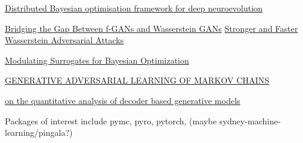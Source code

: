 \documentclass[honours,12pt]{unswthesis}
\numberwithin{equation}{section}
\begin{document}
\href{https://pdf.sciencedirectassets.com/271597/1-s2.0-S0925231221X00409/1-s2.0-S0925231221015319/main.pdf?X-Amz-Security-Token=IQoJb3JpZ2luX2VjEAsaCXVzLWVhc3QtMSJGMEQCIFyD6EVhq7gdc13HAw8Qa2abqSEg7RfyW64DmMVAwR%2FAAiAx%2FqYNhfvEXwgQS08r%2FMhhr5VEr%2Be%2BKQ7Nbt9dBYn1iir6AwgjEAQaDDA1OTAwMzU0Njg2NSIMzSUp5Xe14ZtAoyoUKtcD5V8UPCBeS1sryr6y2PzuwXdsx%2FBvmdgsnfgRx1Acrgomb7ZC%2BVpRecYAvucvzsgbXwr4%2FY23IWXOjQVvqaIcF9d6%2F3VF5lJjfBtqyUDoUAZ6fMfSVsgKbMRkbIK%2BUaZot4%2BXfz7LLN3HZla8oHd2sTktGlGF8x4e9UR2PONy%2FZt%2B8Le6H%2FpmTQOEChAS5I23%2Bw0g%2BbW%2B%2FMIOpbdP4tGzrxVpJX4swn1N5QW4SIVF1abKsksuJPt%2FAGLYy%2BzlTEGZ55ycsE0DO3HIQHzRcQcO0MCYd0GcP8sNOmRCk3Jay5KLK%2FPdw0xHow7982Mra1vNMPHgcNPESFshdfg3ukTsqBWWi6AsbEiYJwJDbO1CHpZ4WGllcAvKc91KyLqQE6XUSLzJUCykxTtb1rvjq9ypjki44bdW2ROmKJ%2BymoRnGspYm8U%2FweObZTTKA5LygERVcMPMXLutBWzdSJxvE2DoRgTx5gUpkEpOblBl4QYSwGRFfy1RwxilaNC82XhmeEPUUySfONoSD%2BdRZJk4gtNUjrBJKTtXe7PK8UrnhLybytQ%2BBZTZEl7iU5yb1Zc5jtiGinqiB3FNJ%2BMadk3%2B5ZtfRK2E%2BI5ETcjD6uUYt44KY4kx93sSt%2BAMMNXO844GOqYBLuihn5E46ZnGuLqmP2PzNJSAQ%2F%2Fx6X4SDKC8iS2%2FUaj7e5GPNb69qrcYy%2BnYMmk1XyXxk%2FBmpBj7oKIaS3Xu1GvczXn1i1keem794sv93urWnxC7hYa5Rlx9S2cLqOM9mcNsq1xy6R7lKu2T2of2NvbRYDIjIN1BVAHkr0BWiGSL5L4bFyeJwVgfajomw31LAznCz5G7Arbl3L8EssueNZ2DjR7LVw%3D%3D&X-Amz-Algorithm=AWS4-HMAC-SHA256&X-Amz-Date=20220111T025152Z&X-Amz-SignedHeaders=host&X-Amz-Expires=300&X-Amz-Credential=ASIAQ3PHCVTYWCQOVEXF%2F20220111%2Fus-east-1%2Fs3%2Faws4_request&X-Amz-Signature=63ecad95ada9138a0f14d0c02a0a2f2b564d4ca6a5d6e7e02d06e8a7667310c1&hash=e5ac045fcf223511dbac539722bc02c21c35d61165b6e09cd3e194252b56c49e&host=68042c943591013ac2b2430a89b270f6af2c76d8dfd086a07176afe7c76c2c61&pii=S0925231221015319&tid=spdf-4e567811-c9bc-4491-a143-d0a95da3d0eb&sid=d01637fd29bfb242294978015ea29ea8700bgxrqa&type=client#page=1&zoom=100,0,0}{Distributed Bayesian optimisation framework for deep neuroevolution}


\href{https://icml.cc/virtual/2020/poster/6640}{Bridging the Gap Between f-GANs and Wasserstein GANs}
\href{https://icml.cc/virtual/2020/poster/5871}{Stronger and Faster Wasserstein Adversarial Attacks}

\href{https://icml.cc/virtual/2020/poster/6028}{Modulating Surrogates for Bayesian Optimization}

\href{https://github.com/ermongroup/markov-chain-gan}{GENERATIVE ADVERSARIAL LEARNING
OF MARKOV CHAINS
}

\href{google search}{ on the quantitative analysis of decoder based generative models}

\noindent Packages of interest include pymc, pyro, pytorch, (maybe  sydney-machine-learning/pingala?)
\end{document}
